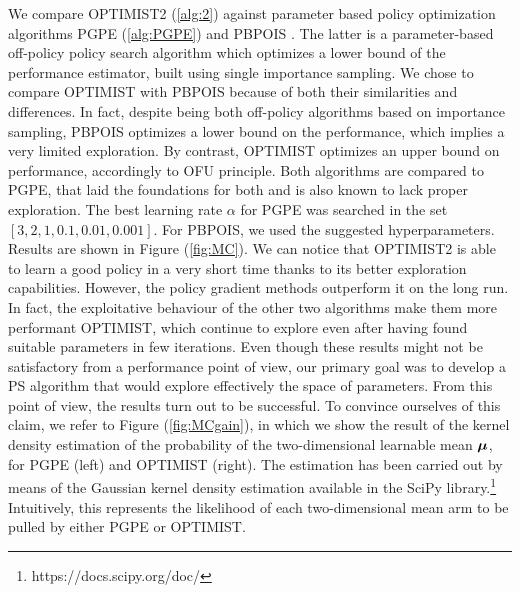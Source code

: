 We compare \gls{OPTIMIST}2 (\ref{alg:2}) against parameter based policy optimization algorithms \gls{PGPE} (\ref{alg:PGPE}) and \gls{PBPOIS} \cite{metelli2018policy}. The latter is a parameter-based off-policy policy search algorithm which optimizes a lower bound of the performance estimator, built using single importance sampling. We chose to compare \gls{OPTIMIST} with \gls{PBPOIS} because of both their similarities and differences. In fact, despite being both off-policy algorithms based on importance sampling, \gls{PBPOIS} optimizes a lower bound on the performance, which implies a very limited exploration. By contrast, \gls{OPTIMIST} optimizes an upper bound on performance, accordingly to \gls{OFU} principle. Both algorithms are compared to \gls{PGPE}, that laid the foundations for both and is also known to lack proper exploration. 
The best learning rate $\alpha$ for \gls{PGPE} was searched in the set $[3, 2, 1, 0.1, 0.01, 0.001]$. For \gls{PBPOIS}, we used the suggested hyperparameters. \\

Results are shown in Figure (\ref{fig:MC}). We can notice that \gls{OPTIMIST}2 is able to learn a good policy in a very short time thanks to its better exploration capabilities. However, the policy gradient methods outperform it on the long run. In fact, the exploitative behaviour of the other two algorithms make them more performant \wrt \gls{OPTIMIST}, which continue to explore even after having found suitable parameters in few iterations. Even though these results might not be satisfactory from a performance point of view, our primary goal was to develop a \gls{PS} algorithm that would explore effectively the space of parameters. From this point of view, the results turn out to be successful. To convince ourselves of this claim, we refer to Figure (\ref{fig:MCgain}), in which we show the result of the kernel density estimation \cite{scott2015multivariate} of the probability of the two-dimensional learnable mean $\boldsymbol{\mu}$, for \gls{PGPE} (left) and \gls{OPTIMIST} (right). The estimation has been carried out by means of the Gaussian kernel density estimation available in the SciPy library.\footnote{https://docs.scipy.org/doc/} Intuitively, this represents the likelihood of each two-dimensional mean arm to be pulled by either \gls{PGPE} or \gls{OPTIMIST}. 

